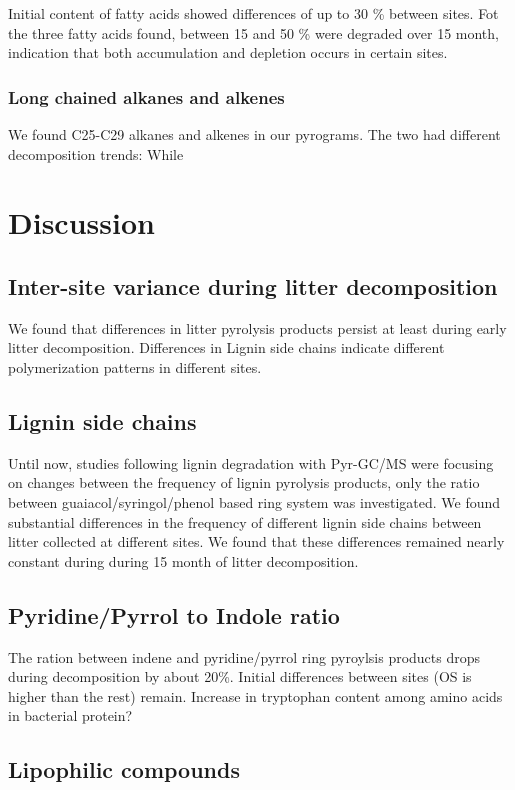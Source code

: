 \documentclass[preprint,review,12pt]{elsarticle}
\begin{document}
Initial content of fatty acids showed differences of up to 30 \% between sites.
Fot the three fatty acids found, between 15 and 50 \% were degraded over 15 month, indication that both accumulation and depletion occurs in certain sites.

\subsubsection{Long chained alkanes and alkenes}

We found C25-C29 alkanes and alkenes in our pyrograms. The two had different decomposition trends: While

\section{Discussion}

\subsection{Inter-site variance during litter decomposition}
We found that differences in litter pyrolysis products persist at least during early litter decomposition. Differences in Lignin side chains indicate different polymerization patterns in different sites. 

\subsection{Lignin side chains}
Until now, studies following lignin degradation with Pyr-GC/MS were focusing on changes between the frequency of lignin pyrolysis products, only the ratio between guaiacol/syringol/phenol based ring system was investigated. We found substantial differences in the frequency of different lignin side chains between litter collected at different sites. We found that these differences remained nearly constant during during 15 month of litter decomposition.

\subsection{Pyridine/Pyrrol to Indole ratio}

The ration between indene and pyridine/pyrrol ring pyroylsis products drops during decomposition by about 20\%. Initial differences between sites (OS is higher than the rest) remain.
Increase in tryptophan content among amino acids in bacterial protein?

\subsection{Lipophilic compounds}
\end{document}
